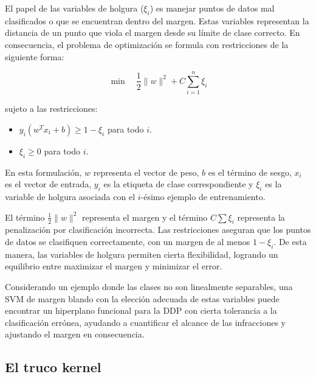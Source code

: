 El papel de las variables de holgura ($\xi_i$) es manejar puntos de datos mal clasificados o que se encuentran dentro del margen. Estas variables representan la distancia de un punto que viola el margen desde su límite de clase correcto. En consecuencia, el problema de optimización se formula con restricciones de la siguiente forma:

\begin{equation}
\min \quad \frac{1}{2} \|w\|^2 + C \sum_{i=1}^{n} \xi_i
\end{equation}

\noindent sujeto a las restricciones:

\begin{itemize}
    \item $y_i(w^T x_i + b) \geq 1 - \xi_i$ para todo $i$.
    \item $\xi_i \geq 0$ para todo $i$.
\end{itemize}

En esta formulación, $w$ representa el vector de peso, $b$ es el término de sesgo, $x_i$ es el vector de entrada, $y_i$ es la etiqueta de clase correspondiente y $\xi_i$ es la variable de holgura asociada con el $i$-ésimo ejemplo de entrenamiento. 

El término $\frac{1}{2} \|w\|^2$ representa el margen y el término $C \sum \xi_i$ representa la penalización por clasificación incorrecta. Las restricciones aseguran que los puntos de datos se clasifiquen correctamente, con un margen de al menos $1 - \xi_i$. De esta manera, las variables de holgura permiten cierta flexibilidad, logrando un equilibrio entre maximizar el margen y minimizar el error. 

Considerando un ejemplo donde las clases no son linealmente separables, una SVM de margen blando con la elección adecuada de estas variables puede encontrar un hiperplano funcional para la DDP con cierta tolerancia a la clasificación errónea, ayudando a cuantificar el alcance de las infracciones y ajustando el margen en consecuencia.

\subsection{El truco kernel}

